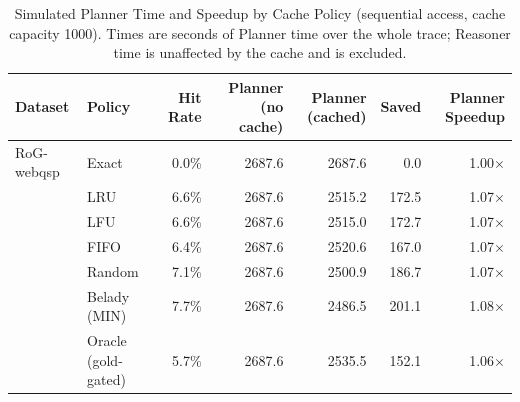 \begin{table}[htbp]
\centering
\caption{Simulated Planner Time and Speedup by Cache Policy (sequential access, cache capacity 1000). Times are seconds of Planner time over the whole trace; Reasoner time is unaffected by the cache and is excluded.}
\label{tab:planner_timing_sequential_1000}
\begin{tabular}{llrrrrr}
\hline
\textbf{Dataset} & \textbf{Policy} & \textbf{Hit Rate} & \textbf{Planner (no cache)} & \textbf{Planner (cached)} & \textbf{Saved} & \textbf{Planner Speedup} \\
\hline
RoG-webqsp & Exact    & 0.0\% & 2687.6 & 2687.6 & 0.0 & 1.00$\times$ \\
         & LRU      & 6.6\% & 2687.6 & 2515.2 & 172.5 & 1.07$\times$ \\
         & LFU      & 6.6\% & 2687.6 & 2515.0 & 172.7 & 1.07$\times$ \\
         & FIFO     & 6.4\% & 2687.6 & 2520.6 & 167.0 & 1.07$\times$ \\
         & Random   & 7.1\% & 2687.6 & 2500.9 & 186.7 & 1.07$\times$ \\
         & Belady (MIN) & 7.7\% & 2687.6 & 2486.5 & 201.1 & 1.08$\times$ \\
         & Oracle (gold-gated) & 5.7\% & 2687.6 & 2535.5 & 152.1 & 1.06$\times$ \\
\hline
\end{tabular}
\end{table}

